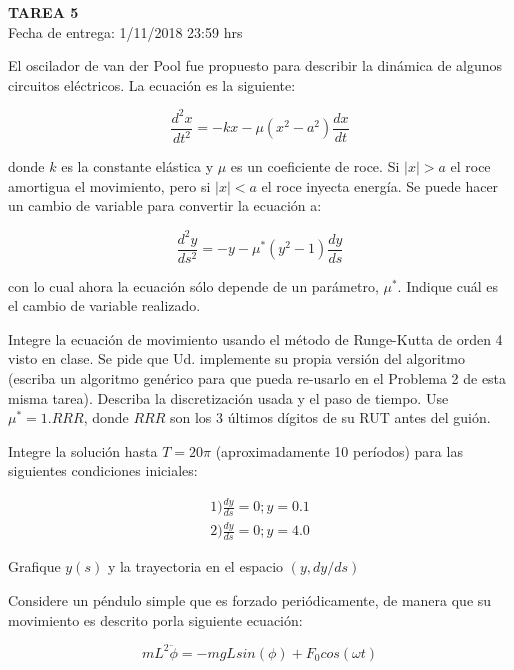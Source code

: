 \documentclass[letter, 11pt]{article}
\newcommand{\tareanro}{5}
\newcommand{\fechaentrega}{1/11/2018 23:59 hrs}
\begin{document}
\thispagestyle{firstpage}

\begin{center}
  {\uppercase{\LARGE \bf Tarea \tareanro}}\\
  Fecha de entrega: \fechaentrega
\end{center}



El oscilador de van der Pool fue propuesto para describir la dinámica de
algunos circuitos eléctricos. La ecuación es la siguiente:

$$\frac{d^2x}{dt^2} = - k x - \mu (x^2 - a^2) \frac{dx}{dt}$$

donde $k$ es la constante elástica y $\mu$ es un coeficiente de roce. Si $|x| >
a$ el roce amortigua el movimiento, pero si $|x| < a$ el roce inyecta energía.
Se puede hacer un cambio de variable para convertir la ecuación a:

$$\frac{d^2y}{ds^2} = - y - \mu^* (y^2 - 1) \frac{dy}{ds}$$

con lo cual ahora la ecuación sólo depende de un parámetro, $\mu^*$. Indique
cuál es el cambio de variable realizado.

Integre la ecuación de movimiento usando el método de Runge-Kutta de orden 4
visto en clase. Se pide que Ud. implemente su propia versión del algoritmo
(escriba un algoritmo genérico para que pueda re-usarlo en el Problema 2 de
esta misma tarea). Describa la discretización usada y el paso de tiempo. Use
$\mu^*=1.RRR$, donde $RRR$ son los 3 últimos dígitos de su RUT antes del guión.

Integre la solución hasta $T=20\pi$ (aproximadamente 10 períodos) para las
siguientes condiciones iniciales:

\begin{align*}
1) \frac{dy}{ds} = 0; y = 0.1\\
2) \frac{dy}{ds} = 0; y = 4.0
\end{align*}

Grafique $y(s)$ y la trayectoria en el espacio $(y, dy/ds)$

\vspace{1.5em}

Considere un péndulo simple que es forzado periódicamente, de manera que su
movimiento es descrito porla siguiente ecuación:

$$ m L^2 \ddot{\phi} = -mgLsin(\phi) + F_0 cos(\omega t) $$
\end{document}
